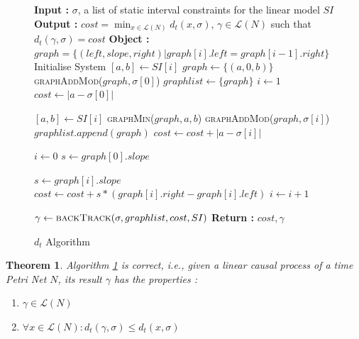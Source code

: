 \documentclass[conference]{IEEEtran}
\makeatletter
\newcommand{\removelatexerror}{\let\@latex@error\@gobble}
\newtheorem{theorem}{Theorem}
\makeatother
\begin{document}
	\begin{figure}[!t]
		\removelatexerror
		\begin{algorithm}[H]
			\caption{$d_t$ Algorithm}
			\label{StampAlgo}
			\begin{algorithmic}
				\State \textbf{Input : }  $\sigma$, a list of static interval constraints for the linear model $SI$
				\State \textbf{Output : }  $cost = \min_{x \in \mathcal{L}(N)}{d_t(x, \sigma)}$, $\gamma \in \mathcal{L}(N)$ such that $d_t(\gamma, \sigma) = cost$
				\State \textbf{Object :} $graph = \{(left, slope, right) | graph[i].left = graph[i-1].right\}$
				\State Initialise System 
				\State $[a, b] \gets SI[i]$
				\State $graph \gets \{(a, 0, b)\}$
				\State \textsc{graphAddMod}($graph, \sigma[0]$)
				\State $graphlist \gets \{graph\}$
				\State $i \gets 1$
				\State $cost \gets |a - \sigma[0]|$
				
				\State $[a, b] \gets SI[i]$
				\State \textsc{graphMin}($graph, a, b$)
				\State \textsc{graphAddMod}($graph, \sigma[i]$)
				\State $graphlist.append(graph)$
				\State $cost \gets cost + |a - \sigma[i]|$
				\EndWhile
				
				\State $i \gets 0$ 
				\State $s \gets graph[0].slope$
				
				\State $s \gets graph[i].slope$ 
				\State $cost \gets cost + s * (graph[i].right - graph[i].left)$
				\State $i \gets i + 1$
				\EndWhile
				
				\State $\gamma \gets \textsc{backTrack}(\sigma, graphlist, cost, SI)$
				\State \textbf{Return : } $cost, \gamma$
				\EndProcedure
			\end{algorithmic}
		\end{algorithm}
	\end{figure}
	
	\begin{theorem}\label{StampAlgoCorr} Algorithm \ref{StampAlgo} is correct, i.e., given a linear causal process of a time Petri Net $N$, its result $\gamma$ has the properties :	
		\begin{enumerate}	\item $\gamma \in \mathcal{L}(N)$
			\item $\forall x \in \mathcal{L}(N)  : d_t(\gamma, \sigma)  \leq  {d_t(x, \sigma)}$
		\end{enumerate}
	\end{theorem}
	
\end{document}
